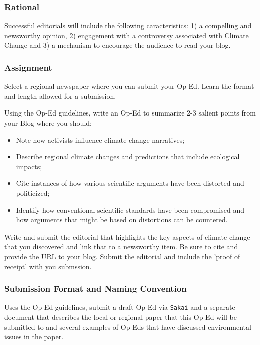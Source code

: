 
\subsubsection{Rational}

Successful editorials will include the following caracteristics: 1) a compelling and newsworthy opinion, 2) engagement with a controversy associated with Climate Change and 3) a mechanism to encourage the audience to read your blog. 

\subsubsection{Assignment}

Select a regional newspaper where you can submit your Op Ed. Learn the format and length allowed for a submission. 

Using the Op-Ed guidelines, write an Op-Ed to summarize 2-3 salient points from your Blog where you should:

\begin{itemize}
  \item Note how activists influence climate change narratives; 
  \item Describe regional climate changes and predictions that include ecological impacts; 
  \item Cite instances of how various scientific arguments have been distorted and politicized;
  \item Identify how conventional scientific standards have been compromised and how arguments that might be based on distortions can be countered.
\end{itemize}

Write and submit the editorial that highlights the key aspects of climate change that you discovered and link that to a newsworthy item. Be sure to cite and provide the URL to your blog. Submit the editorial and include the 'proof of receipt' with you submssion. 

\subsubsection{Submission Format and Naming Convention}

Uses the Op-Ed guidelines, submit a draft Op-Ed via \texttt{Sakai} and a separate document that describes the local or regional paper that this Op-Ed will be submitted to and several examples of Op-Eds that have discussed environmental issues in the paper.


